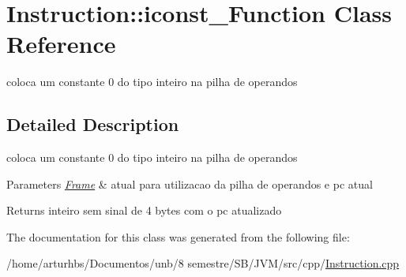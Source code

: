 \hypertarget{classInstruction_1_1iconst__0Function}{}\section{Instruction\+:\+:iconst\+\_\+Function Class Reference}
\label{classInstruction_1_1iconst__0Function}


coloca um constante 0 do tipo inteiro na pilha de operandos  




\subsection{Detailed Description}
coloca um constante 0 do tipo inteiro na pilha de operandos 


\begin{DoxyParams}{Parameters}
{\em \hyperlink{classFrame}{Frame}} & atual para utilizacao da pilha de operandos e pc atual \\
\hline
\end{DoxyParams}
\begin{DoxyReturn}{Returns}
inteiro sem sinal de 4 bytes com o pc atualizado 
\end{DoxyReturn}


The documentation for this class was generated from the following file\+:\begin{DoxyCompactItemize}
\item 
/home/arturhbs/\+Documentos/unb/8 semestre/\+S\+B/\+J\+V\+M/src/cpp/\hyperlink{Instruction_8cpp}{Instruction.\+cpp}\end{DoxyCompactItemize}
